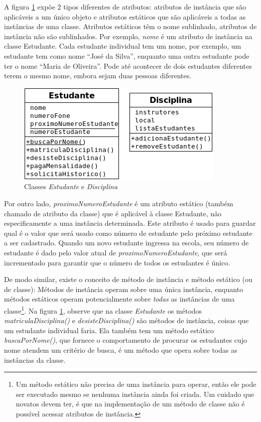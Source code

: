 A figura \ref{fig:class1} expõe 2 tipos diferentes de atributos: atributos de instância que são aplicáveis a um único objeto e atributos estáticos que são aplicáveis a todas as instâncias de uma classe. Atributos estáticos têm o nome sublinhado, atributos de instância não são sublinhados. Por exemplo, \emph{nome} é um atributo de instância na classe Estudante. Cada estudante individual tem um nome, por exemplo, um estudante tem como nome ``José da Silva'', enquanto uma outra estudante pode ter o nome ``Maria de Oliveira''. Pode até acontecer de dois estudantes diferentes terem o mesmo nome, embora sejam duas pessoas diferentes.

\begin{figure}[h]
\begin{center}
\includegraphics[scale=0.85]{class1.png} 
\caption{Classes \emph{Estudante} e \emph{Disciplina}} \label{fig:class1}
\end{center}
\end{figure}

Por outro lado, \emph{proximoNumeroEstudante} é um atributo estático (também chamado de atributo da classe) que é aplicável à classe Estudante, não especificamente a uma instância determinada. Este atributo é usado para guardar qual é o valor que será usado como número de estudante pelo próximo estudante a ser cadastrado. Quando um novo estudante ingressa na escola, seu número de estudante é dado pelo valor atual de \emph{proximoNumeroEstudante}, que será incrementado para garantir que o número de todos os estudantes é único.

De modo similar, existe o conceito de método de instância e método estático (ou de classe): Métodos de instância operam sobre uma única instância, enquanto métodos estáticos operam potencialmente sobre \textit{todas} as instâncias de uma classe\footnote{Um método estático não precisa de uma instância para operar, então ele pode ser executado mesmo se nenhuma instância ainda foi criada. Um cuidado que novatos devem ter, é que na implementação de um método de classe não é possível acessar atributos de instância.}. Na figura \ref{fig:class1}, observe que na classe \emph{Estudante} os métodos \emph{matriculaDisciplina()} e \emph{desisteDisciplina()} são métodos de instância, coisas que um estudante individual faria. Ela também tem um método estático \emph{buscaPorNome()}, que fornece o comportamento de procurar os estudantes cujo nome atendem um critério de busca, é um método que opera sobre todas as instâncias da classe.

